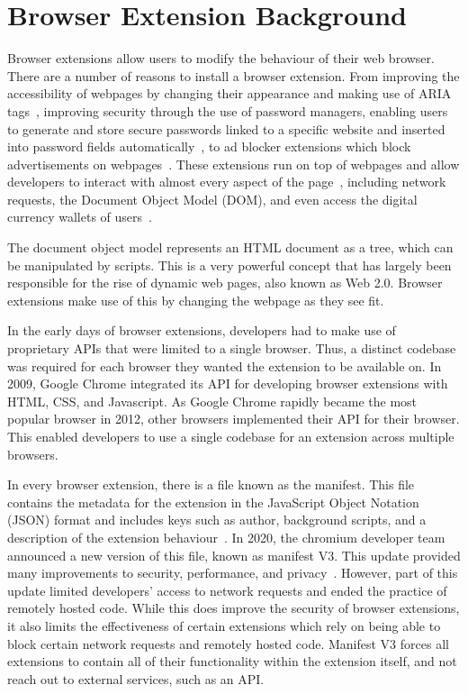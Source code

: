 \documentclass{report}
\begin{document}
\section{Browser Extension Background}

Browser extensions allow users to modify the behaviour of their web browser. There are a number of reasons to install a browser extension. From improving the accessibility of webpages by changing their appearance and making use of ARIA tags~\cite{w3c2018accessible,lsdsoftware2024read}, improving security through the use of password managers, enabling users to generate and store secure passwords linked to a specific website and inserted into password fields automatically~\cite{lastpass}, to ad blocker extensions which block advertisements on webpages~\cite{hill2014ublock}. These extensions run on top of webpages and allow developers to interact with almost every aspect of the page~\cite{frisbe2022building}, including network requests, the Document Object Model (DOM), and even access the digital currency wallets of users~\cite{finlay2015metamask}. 

The document object model represents an HTML document as a tree, which can be manipulated by scripts. This is a very powerful concept that has largely been responsible for the rise of dynamic web pages, also known as Web 2.0. Browser extensions make use of this by changing the webpage as they see fit.

In the early days of browser extensions, developers had to make use of proprietary APIs that were limited to a single browser. Thus, a distinct codebase was required for each browser they wanted the extension to be available on. In 2009, Google Chrome integrated its API for developing browser extensions with HTML, CSS, and Javascript. As Google Chrome rapidly became the most popular browser in 2012, other browsers implemented their API for their browser. This enabled developers to use a single codebase for an extension across multiple browsers. 

In every browser extension, there is a file known as the manifest. This file contains the metadata for the extension in the JavaScript Object Notation (JSON) format and includes keys such as author, background scripts, and a description of the extension behaviour~\cite{bengtsson2020manifest}. In 2020, the chromium developer team announced a new version of this file, known as manifest V3. This update provided many improvements to security, performance, and privacy~\cite{li2020manifest,barnett2021chrome}. However, part of this update limited developers' access to network requests and ended the practice of remotely hosted code. While this does improve the security of browser extensions, it also limits the effectiveness of certain extensions which rely on being able to block certain network requests and remotely hosted code. Manifest V3 forces all extensions to contain all of their functionality within the extension itself, and not reach out to external services, such as an API. 
\end{document}
